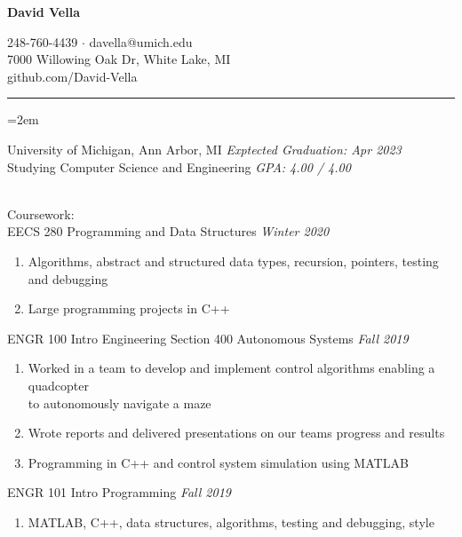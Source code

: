 \documentclass[12pt]{article}
\newcommand{\rheader}[1] { 
    \noindent{ \large \textbf{#1} \par }
    \vspace{-10pt}
    \noindent \rule{7.5in}{0.5pt} 
}
\newcommand{\rdate}[1]{
    \hfill \textit{#1}
}
\newcommand{\ritem} {
    \vspace{-10pt} \item
}
\newenvironment{rsection} {
    \vspace{-5pt}
    \par \medskip
    \leftskip=2em
    \noindent \ignorespaces
} {
    \par \medskip
    \vspace{5pt}
}
\newenvironment{rlist} {
    \begin{enumerate}[leftmargin=0.75in, label=$\bullet$]
} {
    \end{enumerate}
    \vspace{-10pt}
}
\begin{document}
\begin{center}
    {\Large \textbf{David Vella} \par}
    \vspace{5pt}
    248-760-4439 $\cdot$ davella@umich.edu \\
    7000 Willowing Oak Dr, White Lake, MI \\
    github.com/David-Vella
\end{center}

\vspace{-10pt}

\rheader{EDUCATION}
\begin{rsection}
    University of Michigan, Ann Arbor, MI \rdate{Exptected Graduation: Apr 2023} \\
    Studying Computer Science and Engineering \rdate{GPA: 4.00 / 4.00}
    \vspace{5pt} \\
    \noindent Coursework: \\
    EECS 280 Programming and Data Structures \rdate{Winter 2020}
    \begin{rlist}
        \ritem Algorithms, abstract and structured data types, recursion, pointers, testing and debugging
        \ritem Large programming projects in C++
    \end{rlist}
    ENGR 100 Intro Engineering Section 400 Autonomous Systems \rdate{Fall 2019}
    \begin{rlist}
        \ritem Worked in a team to develop and implement control algorithms enabling a quadcopter \\ to autonomously navigate a maze
        \ritem Wrote reports and delivered presentations on our teams progress and results
        \ritem Programming in C++ and control system simulation using MATLAB 
    \end{rlist}
    ENGR 101 Intro Programming \rdate{Fall 2019}
    \begin{rlist}
        \ritem MATLAB, C++, data structures, algorithms, testing and debugging, style 
    \end{rlist}
\end{rsection}
\end{document}
